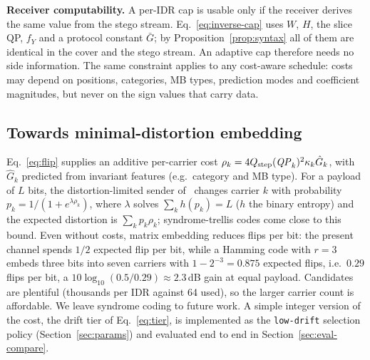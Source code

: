 \textbf{Receiver computability.} A per-IDR cap is usable only if the receiver derives the same value from the stego stream. Eq.~\eqref{eq:inverse-cap} uses $W$, $H$, the slice QP, $f_Y$ and a protocol constant $\bar G$; by Proposition~\ref{prop:syntax} all of them are identical in the cover and the stego stream. An adaptive cap therefore needs no side information. The same constraint applies to any cost-aware schedule: costs may depend on positions, categories, MB types, prediction modes and coefficient magnitudes, but never on the sign values that carry data.

\subsection{Towards minimal-distortion embedding}
Eq.~\eqref{eq:flip} supplies an additive per-carrier cost $\rho_k=4Q_{\mathrm{step}}(\mathit{QP}_k)^2\kappa_k\hat G_k$, with $\hat G_k$ predicted from invariant features (e.g.\ category and MB type). For a payload of $L$ bits, the distortion-limited sender of~\cite{filler2011stc,fridrich2007practical} changes carrier $k$ with probability $p_k=1/(1+e^{\lambda\rho_k})$, where $\lambda$ solves $\sum_k h(p_k)=L$ ($h$ the binary entropy) and the expected distortion is $\sum_kp_k\rho_k$; syndrome-trellis codes come close to this bound. Even without costs, matrix embedding reduces flips per bit: the present channel spends $1/2$ expected flip per bit, while a Hamming code with $r=3$ embeds three bits into seven carriers with $1-2^{-3}=0.875$ expected flips, i.e.\ $0.29$ flips per bit, a $10\log_{10}(0.5/0.29)\approx2.3$\,dB gain at equal payload. Candidates are plentiful (thousands per IDR against 64 used), so the larger carrier count is affordable. We leave syndrome coding to future work. A simple integer version of the cost, the drift tier of Eq.~\eqref{eq:tier}, is implemented as the \texttt{low-drift} selection policy (Section~\ref{sec:params}) and evaluated end to end in Section~\ref{sec:eval-compare}.
